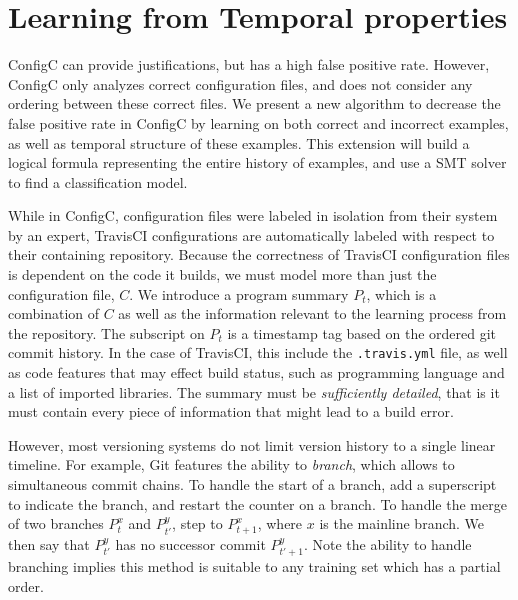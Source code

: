 \section{Learning from Temporal properties}


ConfigC can provide justifications, but has a high false positive rate.
However, ConfigC only analyzes correct configuration files, and does not consider any ordering between these correct files.
We present a new algorithm to decrease the false positive rate in ConfigC by learning on both correct and incorrect examples, as well as temporal structure of these examples.
This extension will build a logical formula representing the entire history of examples, and use a SMT solver to find a classification model.

While in ConfigC, configuration files were labeled in isolation from their system by an expert, TravisCI configurations are automatically labeled with respect to their containing repository.
Because the correctness of TravisCI configuration files is dependent on the code it builds, we must model more than just the configuration file, $C$. 
We introduce a program summary $P_t$, which is a combination of $C$ as well as the information relevant to the learning process from the repository.
The subscript on $P_t$ is a timestamp tag based on the ordered git commit history.
In the case of TravisCI, this include the \verb|.travis.yml| file, as well as code features that may effect build status, such as programming language and a list of imported libraries.
The summary must be \textit{sufficiently detailed}, that is it must contain every piece of information that might lead to a build error.

However, most versioning systems do not limit version history to a single linear timeline.
For example, Git features the ability to \textit{branch}, which allows to simultaneous commit chains.
To handle the start of a branch, add a superscript to indicate the branch, and restart the counter on a branch.
To handle the merge of two branches $P_{t}^{x}$ and $P_{t'}^{y}$, step to $P_{t+1}^{x}$, where $x$ is the mainline branch.
We then say that $P_{t'}^{y}$ has no successor commit $P_{t'+1}^{y}$.
Note the ability to handle branching implies this method is suitable to any training set which has a partial order.

